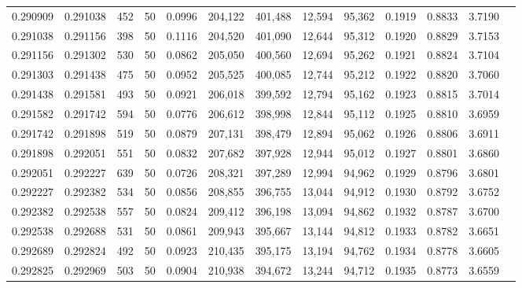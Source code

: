 \begin{tabular}{rrrrrrrrrrrrr}
0.290909 & 0.291038 &   452 &  50 &                                     0.0996 & 204,122 & 401,488 &  12,594 &  95,362 & 0.1919 & 0.8833 & 3.7190 \\
0.291038 & 0.291156 &   398 &  50 &                                     0.1116 & 204,520 & 401,090 &  12,644 &  95,312 & 0.1920 & 0.8829 & 3.7153 \\
0.291156 & 0.291302 &   530 &  50 &                                     0.0862 & 205,050 & 400,560 &  12,694 &  95,262 & 0.1921 & 0.8824 & 3.7104 \\
0.291303 & 0.291438 &   475 &  50 &                                     0.0952 & 205,525 & 400,085 &  12,744 &  95,212 & 0.1922 & 0.8820 & 3.7060 \\
0.291438 & 0.291581 &   493 &  50 &                                     0.0921 & 206,018 & 399,592 &  12,794 &  95,162 & 0.1923 & 0.8815 & 3.7014 \\
0.291582 & 0.291742 &   594 &  50 &                                     0.0776 & 206,612 & 398,998 &  12,844 &  95,112 & 0.1925 & 0.8810 & 3.6959 \\
0.291742 & 0.291898 &   519 &  50 &                                     0.0879 & 207,131 & 398,479 &  12,894 &  95,062 & 0.1926 & 0.8806 & 3.6911 \\
0.291898 & 0.292051 &   551 &  50 &                                     0.0832 & 207,682 & 397,928 &  12,944 &  95,012 & 0.1927 & 0.8801 & 3.6860 \\
0.292051 & 0.292227 &   639 &  50 &                                     0.0726 & 208,321 & 397,289 &  12,994 &  94,962 & 0.1929 & 0.8796 & 3.6801 \\
0.292227 & 0.292382 &   534 &  50 &                                     0.0856 & 208,855 & 396,755 &  13,044 &  94,912 & 0.1930 & 0.8792 & 3.6752 \\
0.292382 & 0.292538 &   557 &  50 &                                     0.0824 & 209,412 & 396,198 &  13,094 &  94,862 & 0.1932 & 0.8787 & 3.6700 \\
0.292538 & 0.292688 &   531 &  50 &                                     0.0861 & 209,943 & 395,667 &  13,144 &  94,812 & 0.1933 & 0.8782 & 3.6651 \\
0.292689 & 0.292824 &   492 &  50 &                                     0.0923 & 210,435 & 395,175 &  13,194 &  94,762 & 0.1934 & 0.8778 & 3.6605 \\
0.292825 & 0.292969 &   503 &  50 &                                     0.0904 & 210,938 & 394,672 &  13,244 &  94,712 & 0.1935 & 0.8773 & 3.6559 \\

\end{tabular}
